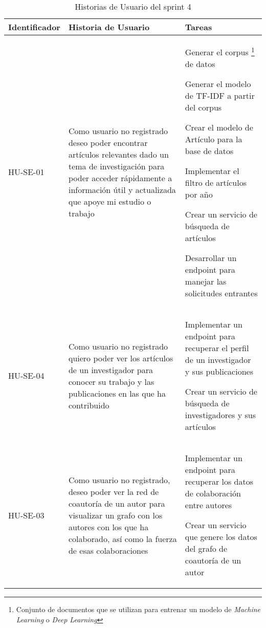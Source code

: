 \begin{table}[!t]
    \centering
    \begin{tabular}{|p{2.5cm}|p{5cm}|p{6cm}|}
        \midrule
        \textbf{Identificador} & \textbf{Historia de Usuario}                                                                                                                                                                               & \textbf{Tareas} \\
        \hline
        HU-SE-01 & Como usuario no registrado deseo poder encontrar artículos relevantes dado un  tema de investigación para poder acceder rápidamente a información útil y actualizada que apoye mi estudio o trabajo        &
        \begin{compactitem}
            \item Generar el corpus \footnote{
                Conjunto de documentos que se utilizan para entrenar un modelo de \textit{Machine Learning} o \textit{Deep Learning}
            } de datos  
            \item Generar el modelo de TF-IDF a partir del corpus
            \item Crear el modelo de Artículo para la base de datos
            \item Implementar el filtro de artículos por año
            \item Crear un servicio de búsqueda de artículos
            \item Desarrollar un endpoint para manejar las solicitudes entrantes
        \end{compactitem}
        \\
        \hline
        HU-SE-04 & Como usuario no registrado quiero poder ver los artículos de un investigador para conocer su trabajo y las publicaciones en las que ha contribuido &
        \begin{compactitem}
            \item Implementar un endpoint para recuperar el perfil de un investigador y sus publicaciones
            \item Crear un servicio de búsqueda de investigadores y sus artículos
        \end{compactitem}
        \\
        \hline
        HU-SE-03 & Como usuario no registrado, deseo poder ver la red de coautoría de un autor para visualizar un grafo con los autores con los que ha colaborado, así como la fuerza de esas colaboraciones &
        \begin{compactitem}
            \item Implementar un endpoint para recuperar los datos de colaboración entre autores
            \item Crear un servicio que genere los datos del grafo de coautoría de un autor
        \end{compactitem}
        \\
        \hline
    \end{tabular}
    \caption{Historias de Usuario del sprint 4}
    \label{C2T4:Historias de Usuario del Sprint 4}
\end{table}
